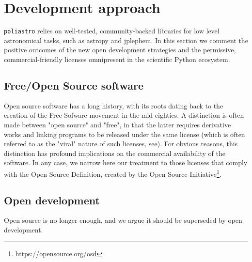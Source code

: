 \section{Development approach}
\label{sec:development}

\verb|poliastro| relies on well-tested, community-backed libraries for low level astronomical tasks, such as astropy\cite{Robitaille2013} and jplephem. In this section we comment the positive outcomes of the new open development strategies and the permissive, commercial-friendly licenses omnipresent in the scientific Python ecosystem.

\subsection{Free/Open Source software}

Open source software has a long history, with its roots dating back to the creation of the Free Sofware movement in the mid eighties\cite{Stallman:1985:GM}. A distinction is often made between "open source" and "free", in that the latter requires derivative works and linking programs to be released under the same license (which is often referred to as the "viral" nature of such licenses, see\cite{stallman2009viewpoint}). For obvious reasons, this distinction has profound implications on the commercial availability of the software. In any case, we narrow here our treatment to those licenses that comply with the Open Source Definition, created by the Open Source Initiative\footnote{https://opensource.org/osd}.



\subsection{Open development}

Open source is no longer enough, and we argue it should be superseded by open development.

